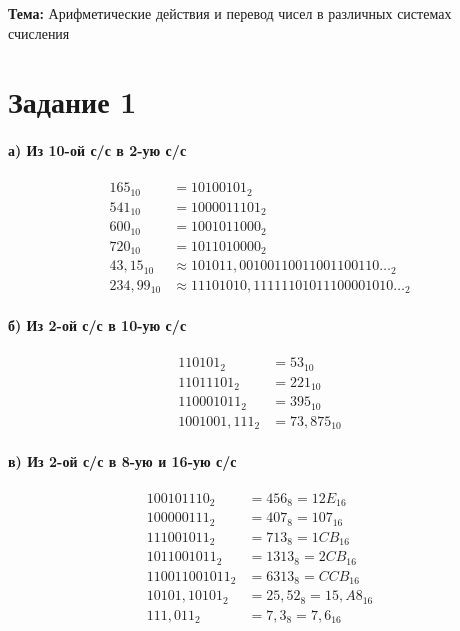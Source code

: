 \documentclass[a4paper,12pt]{article}
\begin{document}
\noindent\textbf{Тема:} Арифметические действия и перевод чисел в
различных системах счисления\par

\section*{Задание 1}
\paragraph{а) Из 10-ой с/с в 2-ую с/с}

$$
\begin{aligned}
165_{10} &= 10100101_2 \\
541_{10} &= 1000011101_2 \\
600_{10} &= 1001011000_2 \\
720_{10} &= 1011010000_2 \\
43{,}15_{10} &\approx 101011{,}00100110011001100110\ldots_2 \\
234{,}99_{10} &\approx 11101010{,}11111101011100001010\ldots_2
\end{aligned}
$$

\paragraph{б) Из 2-ой с/с в 10-ую с/с}

$$
\begin{aligned}
110101_2 &= 53_{10} \\
11011101_2 &= 221_{10} \\
110001011_2 &= 395_{10} \\
1001001{,}111_2 &= 73{,}875_{10}
\end{aligned}
$$

\paragraph{в) Из 2-ой с/с в 8-ую и 16-ую с/с}

$$
\begin{aligned}
100101110_2 &= 456_8 = 12E_{16} \\
100000111_2 &= 407_8 = 107_{16} \\
111001011_2 &= 713_8 = 1CB_{16} \\
1011001011_2 &= 1313_8 = 2CB_{16} \\
110011001011_2 &= 6313_8 = CCB_{16} \\
10101{,}10101_2 &= 25{,}52_8 = 15{,}A8_{16} \\
111{,}011_2 &= 7{,}3_8 = 7{,}6_{16}
\end{aligned}
$$
\end{document}
